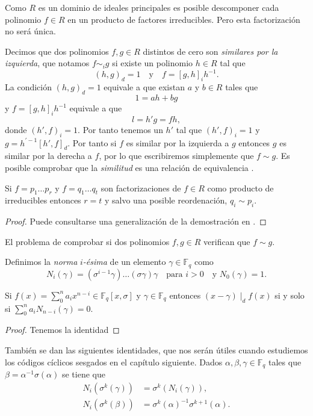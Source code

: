 Como \(R\) es un dominio de ideales principales es posible descomponer cada polinomio \(f \in R\) en un producto de factores irreducibles.
Pero esta factorización no será única.

Decimos que dos polinomios \(f, g \in R\) distintos de cero son \emph{similares por la izquierda}, que notamos \(f \sim_i g\) si existe un polinomio \(h \in R\) tal que 
\[
  (h, g)_d = 1 \quad\text{y}\quad f = [g, h]_ih^{-1}.
\]
La condición \((h, g)_d = 1\) equivale a que existan \(a\) y \(b \in R\) tales que
\[
  1 = ah + bg
\]
y \(f =  [g, h]_ih^{-1}\) equivale a que 
\[
  l = h'g = fh,
\]
donde \((h', f)_i = 1\).
Por tanto tenemos un \(h'\) tal que \((h', f)_i = 1\) y \(g = h^{'-1}[h', f]_d\).
Por tanto si \(f\) es similar por la izquierda a \(g\) entonces \(g\) es similar por la derecha a \(f\), por lo que escribiremos simplemente que \(f \sim g\).
Es posible comprobar que la \emph{similitud} es una relación de equivalencia \parencite[ver][p. 11]{jacobson_finite-dimensional_1996}.


\begin{theorem}
  Si \(f = p_1 \dots p_r\) y \(f = q_1 \dots q_t\) son factorizaciones de \(f \in R\) como producto de irreducibles entonces \(r= t\) y salvo una posible reordenación, \(q_i \sim p_i\).
\end{theorem}

\begin{proof}
  Puede consultarse una generalización de la demostración en \parencite[Teorema 1.2.9]{jacobson_finite-dimensional_1996}.
\end{proof}

El problema de comprobar si dos polinomios \(f, g \in R\) verifican que \(f \sim g\).


Definimos la \emph{norma} \(i\)\emph{-ésima} de un elemento \(\gamma \in \mathbb F_q\) como
\[
  N_i(\gamma) = (\sigma^{i-1}\gamma)\dots (\sigma \gamma)\gamma \quad\text{para } i > 0 \quad\text{y } N_0(\gamma) = 1.
\]

\begin{proposition}
  \label{prop:norma-divisor}
  Si \(f(x) = \sum_0^n a_ix^{n-i} \in \mathbb F_q[x, \sigma]\) y \(\gamma \in \mathbb F_q\) entonces \((x - \gamma) \mid_d f(x)\) si y solo si \(\sum_0^n a_iN_{n-i}(\gamma) = 0\).
\end{proposition}

\begin{proof}
  Tenemos la identidad
\end{proof}

También se dan las siguientes identidades, que nos serán útiles cuando estudiemos los códigos cíclicos sesgados en el capítulo siguiente.
Dados \(\alpha, \beta, \gamma \in \mathbb F_q\) tales que \(\beta = \alpha^{-1}\sigma(\alpha)\) se tiene que
\begin{align}
  N_i(\sigma^k(\gamma)) &= \sigma^k(N_i(\gamma)),\nonumber\\
  N_i(\sigma^k(\beta)) &= \sigma^k(\alpha)^{-1}\sigma^{k+1}(\alpha).
  \label{eq:norma-beta}
\end{align}